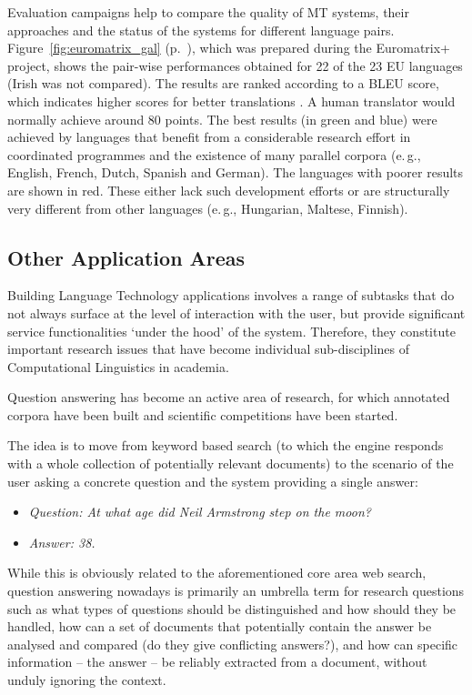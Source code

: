 \begin{multicols}{2}
Evaluation campaigns help to compare the quality of MT systems, their approaches and the status of the systems for different language pairs. Figure~\ref{fig:euromatrix_gal} (p.~\pageref{fig:euromatrix_gal}), which was prepared during the Euromatrix+ project, shows the pair-wise performances obtained for 22 of the 23 EU languages (Irish was not compared). The results are ranked according to a BLEU score, which indicates higher scores for better translations \cite{bleu1}. A human translator would normally achieve around 80 points. The best results (in green and blue) were achieved by languages that benefit from a considerable research effort in coordinated programmes and the existence of many parallel corpora (e.\,g., English, French, Dutch, Spanish and German). The languages with poorer results are shown in red. These either lack such development efforts or are structurally very different from other languages (e.\,g., Hungarian, Maltese, Finnish).

\subsection{Other Application Areas}

Building Language Technology applications involves a range of subtasks that do not always surface at the level of interaction with the user, but provide significant service functionalities ‘under the hood’ of the system. Therefore, they constitute important research issues that have become individual sub-disciplines of Computational Linguistics in academia. 

Question answering has become an active area of research, for which annotated corpora have been built and scientific competitions have been started.

The idea is to move from keyword based search (to which the engine responds with a whole collection of potentially relevant documents) to the scenario of the user asking a concrete question and the system providing a single answer:

\begin{itemize}
\item[] \textit{Question: At what age did Neil Armstrong step on the moon?}
\item[] \textit{Answer: 38.}
\end{itemize}

While this is obviously related to the aforementioned core area web search, question answering nowadays is primarily an umbrella term for research questions such as what types of questions should be distinguished and how should they be handled, how can a set of documents that potentially contain the answer be analysed and compared (do they give conflicting answers?), and how can specific information -- the answer -- be reliably extracted from a document, without unduly ignoring the context. 


\end{multicols}
